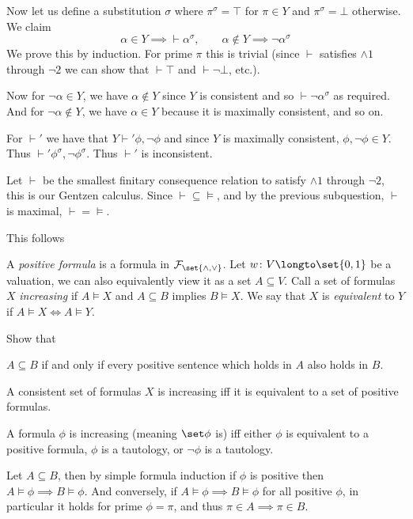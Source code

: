     Now let us define a substitution $\sigma$ where $\pi^\sigma=\top$ for $\pi\in Y$ and $\pi^\sigma=\bot$ otherwise.
    We claim
    $$ \alpha\in Y\implies{}\vdash\alpha^\sigma,\qquad \alpha\notin Y\implies{}\neg\alpha^\sigma $$
    We prove this by induction.
    For prime $\pi$ this is trivial (since $\vdash$ satisfies $\land1$ through $\neg2$ we can show that $\vdash\top$ and $\vdash\neg\bot$, etc.).

    Now for $\neg\alpha\in Y$, we have $\alpha\notin Y$ since $Y$ is consistent and so $\vdash\neg\alpha^\sigma$ as required.
    And for $\neg\alpha\notin Y$, we have $\alpha\in Y$ because it is maximally consistent, and so on.

    For $\vdash'$ we have that $Y\vdash'\phi,\neg\phi$ and since $Y$ is maximally consistent, $\phi,\neg\phi\in Y$.
    Thus $\vdash'\phi^\sigma,\neg\phi^\sigma$.
    Thus $\vdash'$ is inconsistent.

    \item Let $\vdash$ be the smallest finitary consequence relation to satisfy $\land1$ through $\neg2$, this is our Gentzen calculus.
    Since ${\vdash}\subseteq{\vDash}$, and by the previous subquestion, $\vdash$ is maximal, ${\vdash}={\vDash}$.

    \item This follows
\eenum

\bprob

    A {\it positive formula} is a formula in ${\cal F}_{\set{{\land},{\lor}}}$.
    Let $w\colon V\longto\set{0,1}$ be a valuation, we can also equivalently view it as a set
    $A\subseteq V$.
    Call a set of formulas $X$ {\it increasing} if $A\vDash X$ and $A\subseteq B$ implies
    $B\vDash X$.
    We say that $X$ is {\it equivalent} to $Y$ if $A\vDash X\iff A\vDash Y$.

    Show that
    \benum
        \item $A\subseteq B$ if and only if every positive sentence which holds in $A$ also holds
        in $B$.
        \item A consistent set of formulas $X$ is increasing iff it is equivalent to a set of
        positive formulas.
        \item A formula $\phi$ is increasing (meaning $\set\phi$ is) iff either $\phi$ is
        equivalent to a positive formula, $\phi$ is a tautology, or $\neg\phi$ is a tautology.
    \eenum

\eprob

\benum
    \item Let $A\subseteq B$, then by simple formula induction if $\phi$ is positive then $A\vDash\phi\implies B\vDash\phi$.
    And conversely, if $A\vDash\phi\implies B\vDash\phi$ for all positive $\phi$, in particular it holds for prime $\phi=\pi$, and thus $\pi\in A\implies\pi\in B$.

